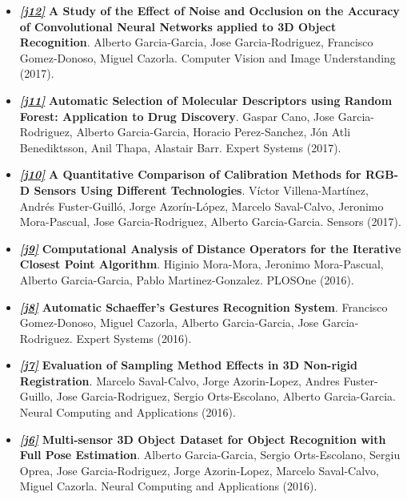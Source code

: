 \documentclass[8pt]{article}
\begin{document}
\begin{itemize}
    \item \emph{\textbf{\href{http://www.sciencedirect.com/science/article/pii/S1077314217301182}{[j12]}}} \textbf{A Study of the Effect of Noise and Occlusion on the Accuracy of Convolutional Neural Networks applied to 3D Object Recognition}. Alberto Garcia-Garcia, Jose Garcia-Rodriguez, Francisco Gomez-Donoso, Miguel Cazorla. Computer Vision and Image Understanding (2017).
    \item \emph{\textbf{\href{http://www.sciencedirect.com/science/article/pii/S0957417416306819}{[j11]}}} \textbf{Automatic Selection of Molecular Descriptors using Random Forest: Application to Drug Discovery}. Gaspar Cano, Jose Garcia-Rodriguez, Alberto Garcia-Garcia, Horacio Perez-Sanchez, Jón Atli Benediktsson, Anil Thapa, Alastair Barr. Expert Systems (2017).
    \item \emph{\textbf{\href{http://www.mdpi.com/1424-8220/17/2/243/htm}{[j10]}}} \textbf{A Quantitative Comparison of Calibration Methods for RGB-D Sensors Using Different Technologies}. Víctor Villena-Martínez, Andrés Fuster-Guilló, Jorge Azorín-López, Marcelo Saval-Calvo, Jeronimo Mora-Pascual, Jose Garcia-Rodriguez, Alberto Garcia-Garcia. Sensors (2017).
    \item \emph{\textbf{\href{http://journals.plos.org/plosone/article?id=10.1371/journal.pone.0164694}{[j9]}}} \textbf{Computational Analysis of Distance Operators for the Iterative Closest Point Algorithm}. Higinio Mora-Mora, Jeronimo Mora-Pascual, Alberto Garcia-Garcia, Pablo Martinez-Gonzalez. PLOSOne (2016).
    \item \emph{\textbf{\href{http://onlinelibrary.wiley.com/doi/10.1111/exsy.12160/abstract}{[j8]}}} \textbf{Automatic Schaeffer's Gestures Recognition System}. Francisco Gomez‐Donoso, Miguel Cazorla, Alberto Garcia‐Garcia, Jose Garcia‐Rodriguez. Expert Systems (2016).
    \item \emph{\textbf{\href{http://link.springer.com/article/10.1007/s00521-016-2258-z}{[j7]}}} \textbf{Evaluation of Sampling Method Effects in 3D Non-rigid Registration}. Marcelo Saval-Calvo, Jorge Azorin-Lopez, Andres Fuster-Guillo, Jose Garcia-Rodriguez, Sergio Orts-Escolano, Alberto Garcia-Garcia. Neural Computing and Applications (2016).
    \item \emph{\textbf{\href{http://link.springer.com/article/10.1007/s00521-016-2224-9}{[j6]}}} \textbf{Multi-sensor 3D Object Dataset for Object Recognition with Full Pose Estimation}. Alberto Garcia-Garcia, Sergio Orts-Escolano, Sergiu Oprea, Jose Garcia-Rodriguez, Jorge Azorin-Lopez, Marcelo Saval-Calvo, Miguel Cazorla. Neural Computing and Applications (2016).

\end{itemize}
\end{document}
